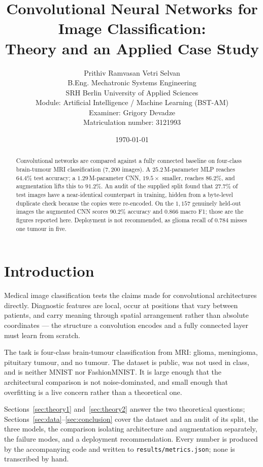 \documentclass[10pt,a4paper]{article}
\title{\vspace{-1.5cm}\textbf{Convolutional Neural Networks for Image
Classification:\\ Theory and an Applied Case Study}}
\author{Prithiv Ramvasan Vetri Selvan \\
\small B.Eng. Mechatronic Systems Engineering \\
\small SRH Berlin University of Applied Sciences \\
\small Module: Artificial Intelligence / Machine Learning (BST-AM) \\
\small Examiner: Grigory Devadze \\
\small Matriculation number: 3121993}
\date{\today}
\begin{document}
\maketitle
\thispagestyle{fancy}

\begin{abstract}
\noindent
Convolutional networks are compared against a fully connected baseline on
four-class brain-tumour MRI classification ($7{,}200$ images). A
$25.2$\,M-parameter MLP reaches $64.4\%$ test accuracy; a $1.29$\,M-parameter
CNN, $19.5\times$ smaller, reaches $86.2\%$, and augmentation lifts this to
$91.2\%$. An audit of the supplied split found that $27.7\%$ of test images have
a near-identical counterpart in training, hidden from a byte-level duplicate
check because the copies were re-encoded. On the $1{,}157$ genuinely held-out
images the augmented CNN scores $90.2\%$ accuracy and $0.866$ macro F1; those
are the figures reported here. Deployment is not recommended, as glioma recall
of $0.784$ misses one tumour in five.
\end{abstract}

\section{Introduction}
Medical image classification tests the claims made for convolutional
architectures directly. Diagnostic features are local, occur at positions that
vary between patients, and carry meaning through spatial arrangement rather than
absolute coordinates --- the structure a convolution encodes and a fully
connected layer must learn from scratch.

The task is four-class brain-tumour classification from MRI: glioma,
meningioma, pituitary tumour, and no tumour. The dataset is public, was not used
in class, and is neither MNIST nor FashionMNIST. It is large enough that the
architectural comparison is not noise-dominated, and small enough that
overfitting is a live concern rather than a theoretical one.

Sections~\ref{sec:theory1} and~\ref{sec:theory2} answer the two theoretical
questions; Sections~\ref{sec:data}--\ref{sec:conclusion} cover the dataset and
an audit of its split, the three models, the comparison isolating architecture
and augmentation separately, the failure modes, and a deployment
recommendation. Every number is produced by the accompanying code and written
to \texttt{results/metrics.json}; none is transcribed by hand.
\end{document}
